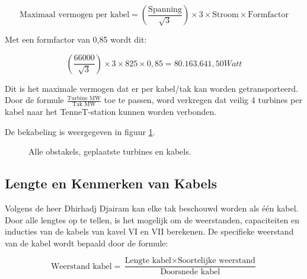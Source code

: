 \begin{equation} \label{eq:26}
\text{{Maximaal vermogen per kabel}} = \left(\frac{{\text{{Spanning}}}}{{\sqrt{3}}}\right) \times 3 \times \text{{Stroom}} \times \text{{Formfactor}}
\end{equation} 

Met een formfactor van 0,85 wordt dit:

\begin{equation} \label{eq:27}
\left(\frac{{66000}}{{\sqrt{3}}}\right) \times 3 \times 825 \times 0,85 = 80.163.641,50 Watt
\end{equation} 

Dit is het maximale vermogen dat er per kabel/tak kan worden getransporteerd. Door de formule \(\frac{{\text{{Turbine MW}}}}{{\text{{Tak MW}}}}\) toe te passen, word verkregen dat veilig 4 turbines per kabel naar het TenneT-station kunnen worden verbonden.

De bekabeling is weergegeven in figuur \ref{fig:windparktotaal}.

\begin{figure}[H]
    \centering
    \setlength{\fboxsep}{0pt}  %
    \colorbox{darkgray}{}
    \caption{Alle obstakels, geplaatste turbines en kabels.}
    \label{fig:windparktotaal}
\end{figure}

\subsection{Lengte en Kenmerken van Kabels}
Volgens de heer Dhirhadj Djairam kan elke tak beschouwd worden als één kabel. Door alle lengtes op te tellen, is het mogelijk om de weerstanden, capaciteiten en inducties van de kabels van kavel VI en VII berekenen. De specifieke weerstand van de kabel wordt bepaald door de formule:

\begin{equation} \label{eq:28}
\text{{Weerstand kabel}} = \frac{{\text{{Lengte kabel}} \times \text{{Soortelijke weerstand}}}}{{\text{{Doorsnede kabel}}}}
\end{equation} 

